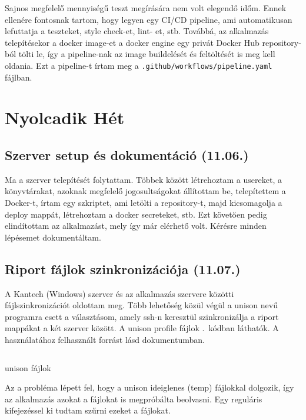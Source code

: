 \documentclass[a4paper]{article}
\newcommand{\inltxt}[1]{\texttt{#1}}
\begin{document}
Sajnos megfelelő mennyiségű teszt megírására nem volt elegendő időm. Ennek ellenére fontosnak
tartom, hogy legyen egy CI/CD pipeline, ami automatikusan lefuttatja a teszteket, style check-et, lint-
et, stb. Továbbá, az alkalmazás telepítésekor a docker image-et a docker engine egy privát Docker Hub
repository-ból tölti le, így a pipeline-nak az image buildelését és feltöltését is meg kell oldania. Ezt a
pipeline-t írtam meg a \inltxt{.github/workflows/pipeline.yaml} fájlban.

\section{Nyolcadik Hét}

\subsection{Szerver setup és dokumentáció (11.06.)}

Ma a szerver telepítését folytattam. Többek között létrehoztam a usereket, a könyvtárakat, azoknak
megfelelő jogosultságokat állítottam be, telepítettem a Docker-t, írtam egy szkriptet, ami letölti a
repository-t, majd kicsomagolja a deploy mappát, létrehoztam a docker secreteket, stb. Ezt követően
pedig elindítottam az alkalmazást, mely így már elérhető volt. Kérésre minden lépésemet
dokumentáltam.

\subsection{Riport fájlok szinkronizációja (11.07.)}

A Kantech (Windows) szerver és az alkalmazás szervere közötti fájlszinkronizációt oldottam meg. Több
lehetőség közül végül a unison nevű programra esett a választásom, amely ssh-n keresztül
szinkronizálja a riport mappákat a két szerver között. A unison profile fájlok
.~kódban láthatók. A használatához felhasznált forrást lásd  dokumentumban.

\begin{listing}[!ht]
\inputminted[bgcolor=codebg, breaklines, breakanywhere, fontsize=\small]{text}{code/unison-files.prf}
\caption{unison fájlok}
\label{listing:unison_files}
\end{listing}

Az a probléma lépett fel, hogy a unison ideiglenes (temp) fájlokkal dolgozik, így az alkalmazás azokat
a fájlokat is megpróbálta beolvasni. Egy reguláris kifejezéssel ki tudtam szűrni ezeket a fájlokat.\\
\end{document}

